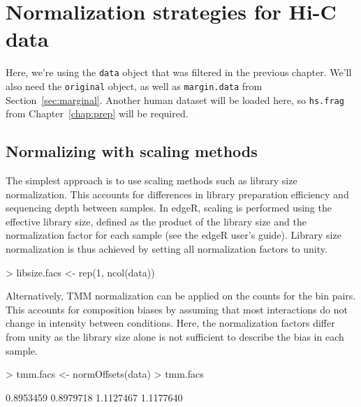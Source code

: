 \documentclass[12pt]{report}
\renewenvironment{Schunk}{\vspace{0pt}}{\vspace{0pt}}
\newcommand{\edgeR}{edgeR}
\newcommand{\code}[1]{{\small\texttt{#1}}}
\newenvironment{combox}
{ \begin{shaded}\begin{center}\begin{minipage}[t]{0.95\textwidth} }
{ \end{minipage}\end{center}\end{shaded} }
\begin{document}
\chapter{Normalization strategies for Hi-C data}

\begin{combox}
Here, we're using the \code{data} object that was filtered in the previous chapter.
We'll also need the \code{original} object, as well as \code{margin.data} from Section~\ref{sec:marginal}.
Another human dataset will be loaded here, so \code{hs.frag} from Chapter~\ref{chap:prep} will be required.
\end{combox}

\section{Normalizing with scaling methods}
\label{sec:simplenorm}

The simplest approach is to use scaling methods such as library size normalization.
This accounts for differences in library preparation efficiency and sequencing depth between samples.
In \edgeR{}, scaling is performed using the effective library size, defined as the product of the library size and the normalization factor for each sample (see the \edgeR{} user's guide).
Library size normalization is thus achieved by setting all normalization factors to unity.


\begin{Schunk}
\begin{Sinput}
> libsize.facs <- rep(1, ncol(data))
\end{Sinput}
\end{Schunk}

Alternatively, TMM normalization \citep{oshlack2010tmm} can be applied on the counts for the bin pairs.
This accounts for composition biases by assuming that most interactions do not change in intensity between conditions.
Here, the normalization factors differ from unity as the library size alone is not sufficient to describe the bias in each sample.

\begin{Schunk}
\begin{Sinput}
> tmm.facs <- normOffsets(data)
> tmm.facs
\end{Sinput}
\begin{Soutput}
[1] 0.8953459 0.8979718 1.1127467 1.1177640
\end{Soutput}
\end{Schunk}
\end{document}
